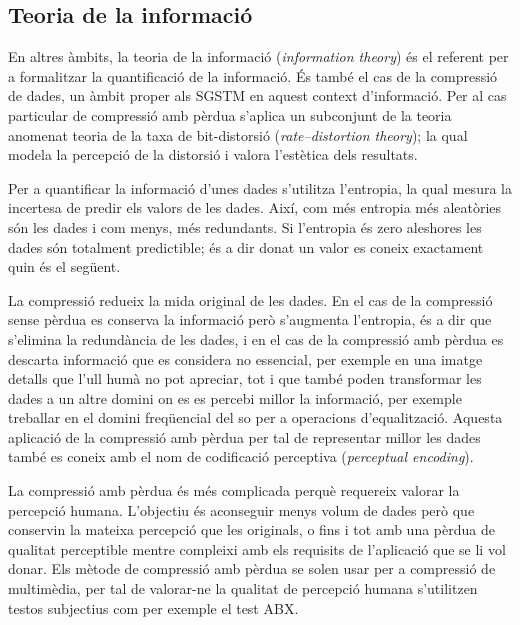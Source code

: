 \subsection{Teoria de la informació}

En altres àmbits, la teoria de la informació (\emph{information
  theory}) és el referent per a formalitzar la quantificació de la
informació. És també el cas de la compressió de dades, un àmbit proper
als \gls{SGSTM} en aquest context d'informació.  Per al cas particular
de compressió amb pèrdua s'aplica un subconjunt de la teoria anomenat
teoria de la taxa de
bit-distorsió %
(\emph{rate–distortion theory}); la qual modela la percepció de la
distorsió i valora l'estètica dels resultats.


Per a quantificar la informació d'unes dades s'utilitza l'entropia, la
qual mesura la incertesa de predir els valors de les dades. Així, com
més entropia més aleatòries són les dades i com menys, més
redundants. Si l'entropia és zero aleshores les dades són totalment
predictible; és a dir donat un valor es coneix exactament quin és el
següent.




La compressió redueix la mida original de les dades. En el cas de la
compressió sense pèrdua es conserva la informació però s'augmenta
l'entropia, és a dir que s'elimina la redundància de les dades, i en
el cas de la compressió amb pèrdua es descarta informació que es
considera no essencial, per exemple en una imatge detalls que l'ull
humà no pot apreciar, tot i que també poden transformar les dades a un
altre domini on es es percebi millor la informació, per exemple
treballar en el domini freqüencial del so per a operacions
d'equalització. Aquesta aplicació de la compressió amb pèrdua per tal
de representar millor les dades també es coneix amb el nom de
codificació perceptiva (\emph{perceptual encoding}).


La compressió amb pèrdua és més complicada perquè requereix valorar la
percepció humana. L'objectiu és aconseguir menys volum de dades però
que conservin la mateixa percepció que les originals, o fins i tot amb
una pèrdua de qualitat perceptible mentre compleixi amb els requisits de
l'aplicació que se li vol donar.
Els mètode de compressió amb pèrdua se solen usar per a compressió de multimèdia, per tal de valorar-ne la qualitat de percepció humana s'utilitzen testos subjectius com per exemple el test ABX.  %



